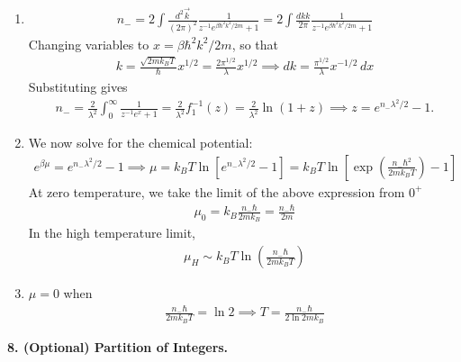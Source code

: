 \documentclass{article}
\theoremstyle{definition}
\newcommand{\be}{\beta}
\newcommand{\f}[2]{\frac{#1}{#2}}
\newcommand{\lp}{\left(}
\newcommand{\rp}{\right)}
\newcommand{\lb}{\left[}
\newcommand{\rb}{\right]}
\begin{document}
\begin{enumerate}[label=(\alph*)]
	\item 
	\begin{align*}
	n_- = 2\int \f{d^2\vec{k}}{(2\pi)^2}\f{1}{z^{-1}e^{\be \hbar^2 k^2/2m} + 1} = 2\int \f{dk k}{2\pi}\f{1}{z^{-1}e^{\be \hbar^2 k^2/2m} + 1}
	\end{align*}
	Changing variables to $x = \be \hbar^2 k^2/2m$, so that 
	\begin{align*}
	k = \f{\sqrt{2m k_B T}}{\hbar} x^{1/2} = \f{2\pi^{1/2}}{\lambda} x^{1/2} \implies dk = \f{\pi^{1/2}}{\lambda}x^{-1/2}\,dx
	\end{align*}
	Substituting gives
	\begin{align*}
	n_- = \f{2}{\lambda^2}\int_0^\infty \f{1}{z^{-1}e^x + 1} = \f{2}{\lambda^2}f^{-1}_{1}(z) = {\f{2}{\lambda^2}\ln(1+z)} \implies z = e^{n_-\lambda^2/2}-1.
	\end{align*}
	
	\item We now solve for the chemical potential:
	\begin{align*}
	e^{\be \mu} = e^{n_- \lambda^2/2}-1 \implies \mu = k_B T \ln\lb e^{n_- \lambda^2/2} - 1  \rb = k_B T \ln \lb \exp(\f{n_- \hbar^2}{2mk_B T}) - 1 \rb
	\end{align*}	
	At zero temperature, we take the limit of the above expression from $0^+$
	\begin{align*}
	\mu_0 = k_B \f{n_- \hbar}{2mk_B} = \f{n_- \hbar}{2m}
	\end{align*}
	In the high temperature limit, 
	\begin{align*}
	\mu_H \sim k_B T \ln \lp \f{n_- \hbar}{2mk_B T}\rp
	\end{align*}
	
	
	\item $\mu=0$ when 
	\begin{align*}
	\f{n_- \hbar}{2mk_B T} = \ln 2 \implies T = \f{n_-\hbar}{2\ln 2 m k_B}
	\end{align*}
	
\end{enumerate}


\noindent \textbf{8. (Optional) Partition of Integers.}
\end{document}
